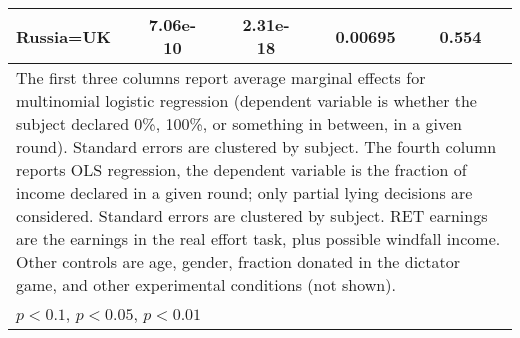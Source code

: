\begin{tabular}{l|cccccc|cc}
Russia=UK       & 7.06e-10         &         & 2.31e-18         &         &  0.00695         &         &    0.554         &         \\
\hline\hline
\multicolumn{9}{p{16cm}}{\tiny The first three columns report average marginal effects for multinomial logistic regression (dependent variable is whether the subject declared 0\%, 100\%, or something in between, in a given round). Standard errors are clustered by subject. The fourth column reports OLS regression, the dependent variable is the fraction of income declared in a given round; only partial lying decisions are considered. Standard errors are clustered by subject. RET earnings are the earnings in the real effort task, plus possible windfall income. Other controls are age, gender, fraction donated in the dictator game, and other experimental conditions (not shown). }\\
\multicolumn{9}{l}{\tiny \sym{*} \(p<0.1\), \sym{**} \(p<0.05\), \sym{***} \(p<0.01\)}\\
\end{tabular}